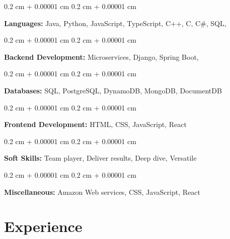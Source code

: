 \documentclass[10pt, letterpaper]{article}
\newenvironment{onecolentry}{
    \begin{adjustwidth}{
        0.2 cm + 0.00001 cm
    }{
        0.2 cm + 0.00001 cm
    }
}{
    \end{adjustwidth}
} %
\begin{document}
        \begin{onecolentry}
            \textbf{Languages:} Java, Python, JavaScript, TypeScript, C++, C, C\#, SQL, 
        \end{onecolentry}

        \vspace{0.2 cm}

        \begin{onecolentry}
            \textbf{Backend Development:} Microservices, Django, Spring Boot, 
        \end{onecolentry}

        \vspace{0.2 cm}

        \begin{onecolentry}
            \textbf{Databases:} SQL, PostgreSQL, DynamoDB, MongoDB, DocumentDB 
        \end{onecolentry}

        \vspace{0.2 cm}

        \begin{onecolentry}
            \textbf{Frontend Development:} HTML, CSS, JavaScript, React 
        \end{onecolentry}

        \vspace{0.2 cm}

        \begin{onecolentry}
            \textbf{Soft Skills:} Team player, Deliver results, Deep dive, Versatile  
        \end{onecolentry}
        
        \vspace{0.2 cm}
        
        \begin{onecolentry}
            \textbf{Miscellaneous:} Amazon Web services, CSS, JavaScript, React 
        \end{onecolentry}
    
    \section{Experience}
        
\end{document}
